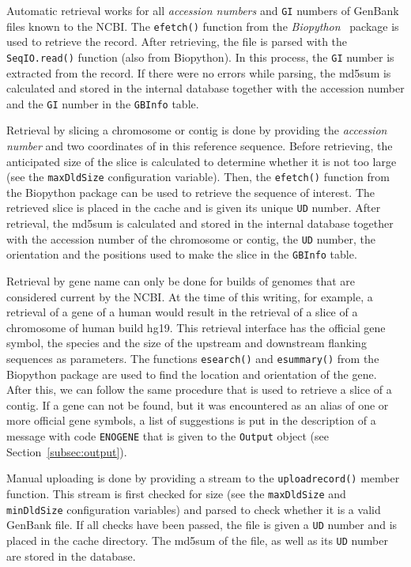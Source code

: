 \documentclass{article}
\begin{document}
Automatic retrieval works for all \emph{accession numbers} and \texttt{GI}
numbers of GenBank files known to the NCBI. The \texttt{efetch()} function from
the \emph{Biopython}~\cite{BIOPYTHON} package is used to retrieve the record.
After retrieving, the file is parsed with the \texttt{SeqIO.read()} function
(also from Biopython). In this process, the \texttt{GI} number is extracted
from the record. If there were no errors while parsing, the md5sum is
calculated and stored in the internal database together with the accession
number and the \texttt{GI} number in the \texttt{GBInfo} table.

Retrieval by slicing a chromosome or contig is done by providing the
\emph{accession number} and two coordinates of in this reference sequence.
Before retrieving, the anticipated size of the slice is calculated to determine
whether it is not too large (see the \texttt{maxDldSize} configuration
variable). Then, the \texttt{efetch()} function from the Biopython package can
be used to retrieve the sequence of interest. The retrieved slice is placed in
the cache and is given its unique \texttt{UD} number. After retrieval, the
md5sum is calculated and stored in the internal database together with the
accession number of the chromosome or contig, the \texttt{UD} number, the
orientation and the positions used to make the slice in the \texttt{GBInfo}
table.

Retrieval by gene name can only be done for builds of genomes that are
considered current by the NCBI. At the time of this writing, for example, a
retrieval of a gene of a human would result in the retrieval of a slice of a
chromosome of human build hg19. This retrieval interface has the official
gene symbol, the species and the size of the upstream and downstream flanking
sequences as parameters. The functions \texttt{esearch()} and
\texttt{esummary()} from the Biopython package are used to find the location
and orientation of the gene. After this, we can follow the same procedure that
is used to retrieve a slice of a contig. If a gene can not be found, but it was
encountered as an alias of one or more official gene symbols, a list of
suggestions is put in the description of a message with code \texttt{ENOGENE}
that is given to the \texttt{Output} object (see Section~\ref{subsec:output}).

Manual uploading is done by providing a stream to the \texttt{uploadrecord()}
member function. This stream is first checked for size (see the
\texttt{maxDldSize} and \texttt{minDldSize} configuration variables) and parsed
to check whether it is a valid GenBank file. If all checks have been passed,
the file is given a \texttt{UD} number and is placed in the cache directory.
The md5sum of the file, as well as its \texttt{UD} number are stored in the
database.
\end{document}
